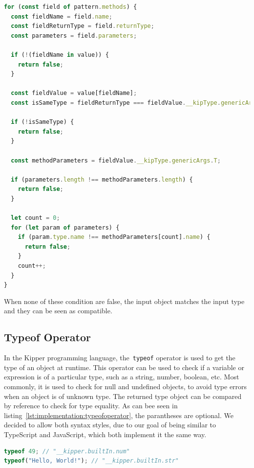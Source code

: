 \begin{lstlisting}[language=Typescript,caption=Matches operator method comparison,label=lst:implementation:matchesmethod]
for (const field of pattern.methods) {
  const fieldName = field.name;
  const fieldReturnType = field.returnType;
  const parameters = field.parameters;

  if (!(fieldName in value)) {
    return false;
  }

  const fieldValue = value[fieldName];
  const isSameType = fieldReturnType === fieldValue.__kipType.genericArgs.R;

  if (!isSameType) {
    return false;
  }

  const methodParameters = fieldValue.__kipType.genericArgs.T;

  if (parameters.length !== methodParameters.length) {
    return false;
  }

  let count = 0;
  for (let param of parameters) {
    if (param.type.name !== methodParameters[count].name) {
      return false;
    }
    count++;
  }
}
\end{lstlisting}

When none of these condition are false, the input object matches the input type and they can be seen as compatible.

\subsection{Typeof Operator}
\label{subsec:typeof}

In the Kipper programming language, the~\lstinline|typeof| operator is used to get the type of an object at runtime. This operator can be used to check if a variable or expression is of a particular type, such as a string, number, boolean, etc. Most commonly, it is used to check for null and undefined objects, to avoid type errors when an object is of unknown type. The returned type object can be compared by reference to check for type equality. As can bee seen in listing~\ref{lst:implementation:typeofoperator}, the parantheses are optional. We decided to allow both syntax styles, due to our goal of being similar to TypeScript and JavaScript, which both implement it the same way.

\begin{lstlisting}[language=Typescript,caption=Typeof operator used to determine the type of an input expression,label=lst:implementation:typeofoperator]
typeof 49; // "__kipper.builtIn.num"
typeof("Hello, World!"); // "__kipper.builtIn.str"
\end{lstlisting}

